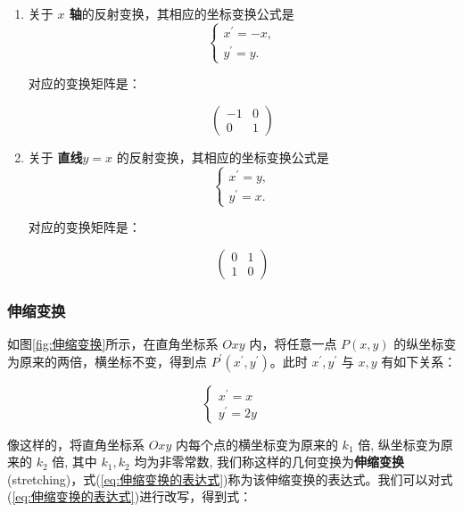 \begin{solution}

\begin{enumerate}
    \item 关于 \textbf{$x$ 轴}的反射变换，其相应的坐标变换公式是
$$
\left\{\begin{array}{c}
x^{\prime}=-x, \\
y^{\prime}=y .
\end{array}\right.
$$

对应的变换矩阵是：

$$
 \left(\begin{array}{cc}-1 & 0 \\ 0 & 1\end{array}\right)
$$
\item 关于 \textbf{直线$y=x$} 的反射变换，其相应的坐标变换公式是
$$
\left\{\begin{array}{c}
x^{\prime}=y, \\
y^{\prime}=x .
\end{array}\right.
$$

对应的变换矩阵是：

$$
 \left(\begin{array}{cc}0 & 1 \\ 1 & 0\end{array}\right)
$$
\end{enumerate}
\end{solution}

\subsubsection{伸缩变换}
\label{subsubsec:伸缩变换}

如图\ref{fig:伸缩变换}所示，在直角坐标系 $O x y$ 内，将任意一点 $P(x, y)$ 的纵坐标变为原来的两倍，横坐标不变，得到点 $P^{\prime}\left(x^{\prime}, y^{\prime}\right)$。此时 $x^{\prime}, y^{\prime}$ 与 $x, y$ 有如下关系：

\begin{equation}
\left\{\begin{array}{l}
x^{\prime}=x \\
y^{\prime}=2 y
\end{array}\right.
\label{eq:伸缩变换的表达式}
\end{equation}

像这样的，将直角坐标系 $O x y$ 内每个点的横坐标变为原来的 $k_1$ 倍, 纵坐标变为原来的 $k_2$ 倍, 其中 $k_1, k_2$ 均为非零常数, 我们称这样的几何变换为\textcolor{third}{\bf 伸缩变换} (stretching)，式(\ref{eq:伸缩变换的表达式})称为该伸缩变换的表达式。我们可以对式(\ref{eq:伸缩变换的表达式})进行改写，得到式：

